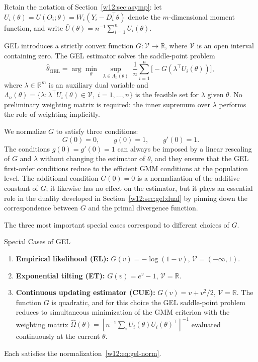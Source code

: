 \documentclass[master.tex]{subfiles}
\begin{document}
Retain the notation of Section~\ref{w12:sec:asymp}: let
$U_i(\theta) = U(O_i;\theta) = W_i(Y_i - D_i^\top\theta)$ denote
the $m$-dimensional moment function, and write
$\bar{U}(\theta) = n^{-1}\sum_{i=1}^n U_i(\theta)$.

GEL introduces a strictly convex function
$G\colon \mathcal{V} \to \mathbb{R}$, where $\mathcal{V}$ is an
open interval containing zero.  The GEL estimator solves the
saddle-point problem
\begin{equation}
  \hat\theta_{\mathrm{GEL}}
  = \arg\min_{\theta}\;
    \sup_{\lambda \in \Lambda_n(\theta)}\;
    \frac{1}{n}\sum_{i=1}^n \bigl[-G\!\left(\lambda^\top U_i(\theta)\right)\bigr],
  \label{w12:eq:gel}
\end{equation}
where $\lambda \in \mathbb{R}^m$ is an auxiliary dual variable and
$\Lambda_n(\theta) = \{\lambda : \lambda^\top U_i(\theta) \in
\mathcal{V},\;i = 1,\ldots,n\}$ is the feasible set for $\lambda$
given $\theta$.  No preliminary weighting matrix is required: the
inner supremum over $\lambda$ performs the role of weighting
implicitly.

We normalize $G$ to satisfy three conditions:
\begin{equation}
  G(0) = 0,
  \qquad
  g(0) = 1,
  \qquad
  g'(0) = 1.
  \label{w12:eq:gel-norm}
\end{equation}
The conditions $g(0) = g'(0) = 1$ can always be imposed by a
linear rescaling of $G$ and $\lambda$ without changing the
estimator of $\theta$, and they ensure that the GEL first-order
conditions reduce to the efficient GMM conditions at the population
level.  The additional condition $G(0) = 0$ is a normalization of
the additive constant of $G$; it likewise has no effect on the
estimator, but it plays an essential role in the duality developed in
Section~\ref{w12:sec:gel:dual} by pinning down the correspondence
between $G$ and the primal divergence function.

The three most important special cases correspond to different
choices of $G$.

\begin{defn}{Special Cases of GEL}
\label{w12:defn:gel-cases}
\begin{enumerate}
  \item \textbf{Empirical likelihood (EL):}
    $G(v) = -\log(1 - v)$, $\mathcal{V} = (-\infty, 1)$.
  \item \textbf{Exponential tilting (ET):}
    $G(v) = e^v - 1$, $\mathcal{V} = \mathbb{R}$.
  \item \textbf{Continuous updating estimator (CUE):}
    $G(v) = v + v^2/2$, $\mathcal{V} = \mathbb{R}$.
    The function $G$ is quadratic, and for this choice the
    GEL saddle-point problem reduces to simultaneous minimization
    of the GMM criterion with the weighting matrix
    $\hat\Omega(\theta) = [n^{-1}\sum_i U_i(\theta) U_i(\theta)^\top]^{-1}$
    evaluated continuously at the current $\theta$.
\end{enumerate}
Each satisfies the normalization~\eqref{w12:eq:gel-norm}.
\end{defn}
\end{document}
